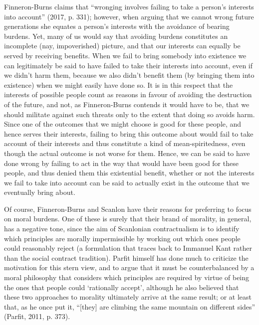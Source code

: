 \documentclass[man,11pt,a4paper]{apa7}
\begin{document}
Finneron-Burns claims that ``wronging involves failing to take a person's interests into account'' (2017, p. 331); however, when arguing that we cannot wrong future generations she equates a person's interests with the avoidance of bearing burdens. Yet, many of us would say that avoiding burdens constitutes an incomplete (nay, impoverished) picture, and that our interests can equally be served by receiving benefits. When we fail to bring somebody into existence we can legitimately be said to have failed to take their interests into account, even if we didn't harm them, because we also didn't benefit them (by bringing them into existence) when we might easily have done so. It is in this respect that the interests of possible people count as reasons in favour of avoiding the destruction of the future, and not, as Finneron-Burns contends it would have to be, that we should militate against such threats only to the extent that doing so avoids harm. Since one of the outcomes that we might choose is good for these people, and hence serves their interests, failing to bring this outcome about would fail to take account of their interests and thus constitute a kind of mean-spiritedness, even though the actual outcome is not worse for them. Hence, we can be said to have done wrong by failing to act in the way that would have been good for these people, and thus denied them this existential benefit, whether or not the interests we fail to take into account can be said to actually exist in the outcome that we eventually bring about.

Of course, Finneron-Burns and Scanlon have their reasons for preferring to focus on moral burdens. One of these is surely that their brand of morality, in general, has a negative tone, since the aim of Scanlonian contractualism is to identify which principles are morally impermissible by working out which ones people could reasonably reject (a formulation that traces back to Immanuel Kant rather than the social contract tradition). Parfit himself has done much to criticize the motivation for this stern view, and to argue that it must be counterbalanced by a moral philosophy that considers which principles are required by virtue of being the ones that people could `rationally accept', although he also believed that these two approaches to morality ultimately arrive at the same result; or at least that, as he once put it, ``[they] are climbing the same mountain on different sides'' (Parfit, 2011, p. 373).
\end{document}
